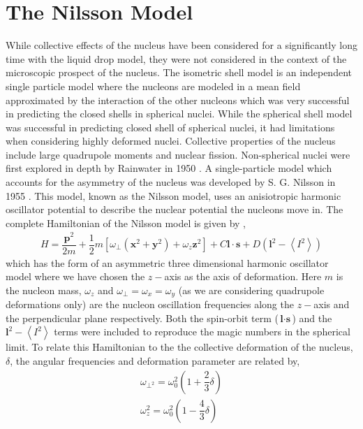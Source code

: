 \documentclass[10pt,a4paper, twoside]{report}
\begin{document}
\section{The Nilsson Model}
While collective effects of the nucleus have been considered for a significantly long time with the liquid drop model, they were not considered in the context of the microscopic prospect of the nucleus. The isometric shell model is an independent single particle model where the nucleons are modeled in a mean field approximated by the interaction of the other nucleons which was very successful in predicting the closed shells in spherical nuclei\cite{Mayer1949, Jensen1949}. While the spherical shell model was successful in predicting closed shell of spherical nuclei, it had limitations when considering highly deformed nuclei. Collective properties of the nucleus include large quadrupole moments and nuclear fission. Non-spherical nuclei were first explored in depth by Rainwater in 1950 \cite{Rainwater1950}. A single-particle model which accounts for the asymmetry of the nucleus was developed by S. G. Nilsson in 1955 \cite{Nilsson1955}. This model, known as the Nilsson model, uses an anisiotropic harmonic oscillator potential to describe the nuclear potential the nucleons move in. The complete Hamiltonian of the Nilsson model is given by \cite{Nilsson1955, Gustafson1967},
\begin{align} \label{eq:NilssonHamiltonian}
H = \dfrac{\textbf{p}^2}{2m} + \dfrac{1}{2}m \left[\omega_{\perp}\left(\textbf{x}^2 + \textbf{y}^2\right) + \omega_z \textbf{z}^2\right] + C\textbf{l}\cdot \textbf{s} + D \left(\textbf{l}^2 - \left<I^2\right>\right)
\end{align}
which has the form of an asymmetric three dimensional harmonic oscillator model where we have chosen the $z-$axis as the axis of deformation. Here $m$ is the nucleon mass, $\omega_z$ and $\omega_{\perp} = \omega_x = \omega_y$ (as we are considering quadrupole deformations only) are the nucleon oscillation frequencies along the $z-$axis and the perpendicular  plane respectively.  Both the spin-orbit term ($\textbf{l}\cdot \textbf{s}$) and the  $\textbf{l}^2 - \left<I^2\right>$ terms were included to reproduce the magic numbers in the spherical limit. To relate this Hamiltonian to the the collective deformation of the nucleus, $\delta$, the angular frequencies and deformation parameter are related by,
\begin{align*}
\omega_{\perp^{2}} = \omega_0^2\left(1 + \dfrac{2}{3}\delta\right) \\
\omega_z^2 = \omega_0^2\left(1 - \dfrac{4}{3}\delta\right)
\end{align*}
\end{document}
